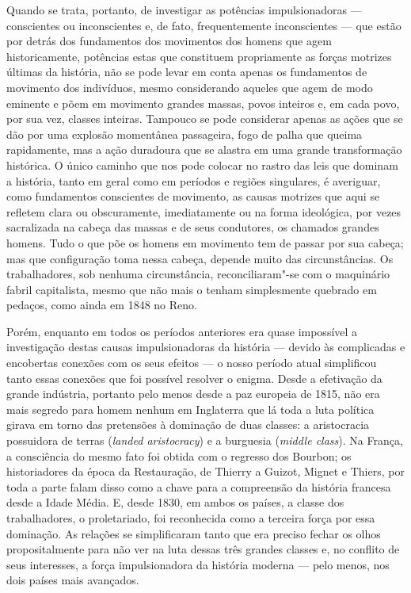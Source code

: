 Quando se trata, portanto, de investigar as potências impulsionadoras --- conscientes ou inconscientes e, de fato, frequentemente inconscientes --- que estão por detrás dos fundamentos dos movimentos dos
homens que agem historicamente, potências estas que constituem propriamente as forças 
motrizes últimas da história, não se pode levar em conta apenas os fundamentos
de movimento dos indivíduos, mesmo considerando aqueles que agem de modo eminente e põem em movimento grandes massas, povos inteiros e,
em cada povo, por sua vez, classes inteiras. Tampouco se pode considerar apenas as ações que se dão
por uma explosão momentânea passageira, fogo de palha que queima
rapidamente, mas a ação duradoura que se alastra em uma grande
transformação histórica. O único caminho que nos pode colocar no rastro das leis que dominam a história, tanto em geral como em períodos e regiões singulares, é averiguar, como fundamentos conscientes de movimento, as causas motrizes que aqui se
refletem clara ou obscuramente, imediatamente ou na forma ideológica,
por vezes sacralizada na cabeça das massas e de seus condutores, os chamados grandes homens. Tudo
o que põe os homens em movimento tem de passar por sua cabeça; mas que
configuração toma nessa cabeça, depende muito das circunstâncias. Os
trabalhadores, sob nenhuma circunstância, reconciliaram"-se com o
maquinário fabril capitalista, mesmo que não mais o tenham simplesmente
quebrado em pedaços, como ainda em 1848 no Reno.

Porém, enquanto em todos os períodos anteriores era quase impossível a
investigação destas causas impulsionadoras da história --- devido às
complicadas e encobertas conexões com os seus efeitos --- o nosso período
atual simplificou tanto essas conexões que foi possível resolver o
enigma. Desde a efetivação da grande indústria, 
portanto pelo menos desde a paz europeia de 1815, não era mais segredo
para homem nenhum em Inglaterra que lá toda a luta política girava em
torno das pretensões à dominação de duas classes: a aristocracia
possuidora de terras (\emph{landed
aristocracy}) e a burguesia (\emph{middle
class}). Na França, a consciência do mesmo
fato foi obtida com o regresso dos Bourbon; os historiadores da época
da Restauração, de Thierry a Guizot, Mignet e Thiers,
por toda a parte falam disso como a chave para a compreensão da
história francesa desde a Idade Média. E, desde 1830, em ambos os
países, a classe dos trabalhadores, o proletariado, foi reconhecida como
a terceira força por essa dominação. As relações se 
simplificaram tanto que era preciso fechar os olhos propositalmente para
não ver na luta dessas três grandes classes e, no conflito de seus
interesses, a força impulsionadora da história moderna --- pelo menos, nos
dois países mais avançados.\est\

